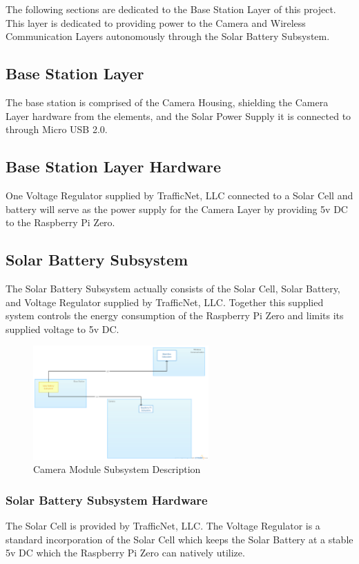 The following sections are dedicated to the Base Station Layer of this project. This layer is dedicated to providing power to the Camera and Wireless Communication Layers autonomously through the Solar Battery Subsystem.

\subsection{Base Station Layer}
The base station is comprised of the Camera Housing, shielding the Camera Layer hardware from the elements, and the Solar Power Supply it is connected to through Micro USB 2.0.

\subsection{Base Station Layer Hardware}
One Voltage Regulator supplied by TrafficNet, LLC connected to a Solar Cell and battery will serve as the power supply for the Camera Layer by providing 5v DC to the Raspberry Pi Zero.

\subsection{Solar Battery Subsystem}
The Solar Battery Subsystem actually consists of the Solar Cell, Solar Battery, and Voltage Regulator supplied by TrafficNet, LLC. Together this supplied system controls the energy consumption of the Raspberry Pi Zero and limits its supplied voltage to 5v DC.

\begin{figure}[h!] 
 	\centering 
  	\includegraphics[width=0.60\textwidth]{architectural design specification latex/images/ADSdiagrams/solarbatterysubsystem.png} 
 \caption{Camera Module Subsystem Description} 
\end{figure}

\subsubsection{Solar Battery Subsystem Hardware}
The Solar Cell is provided by TrafficNet, LLC. The Voltage Regulator is a standard incorporation of the Solar Cell which keeps the Solar Battery at a stable 5v DC which the Raspberry Pi Zero can natively utilize.

